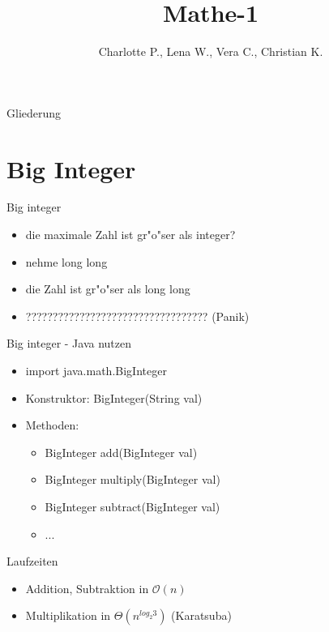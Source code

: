 \documentclass[18pt]{beamer}
\title[Short title]{Mathe-1}
\author{Charlotte P., Lena W., Vera C., Christian K.}
\institute{ITI Wagner \& IPD Tichy}
\begin{document}

\begin{frame}
\titlepage
\end{frame}

\begin{frame}{Gliederung}
\tableofcontents
\end{frame}

\section {Big Integer}
\begin{frame}{Big integer}
\begin {itemize}
\item die maximale Zahl ist gr"o"ser als integer?
\pause 
\item nehme long long
\pause
\item die Zahl ist gr"o"ser als long long
\pause 
\item ?????????????????????????????????? (Panik) 
\end {itemize}
\end{frame}

\begin{frame}{Big integer - Java nutzen}
\begin {itemize}
\item import java.math.BigInteger
\item Konstruktor: BigInteger(String val)
\item Methoden:
\begin {itemize}
\item BigInteger add(BigInteger val)
\item BigInteger multiply(BigInteger val)
\item BigInteger subtract(BigInteger val)
\item ...
\end {itemize}
\end {itemize}
\end{frame}

\begin{frame} {Laufzeiten}
\begin {itemize}
\item Addition, Subtraktion in $\mathcal{O}(n)$
\item Multiplikation in $\Theta(n^{log_{2}3})$ (Karatsuba)
\end {itemize}
\end{frame}
\end{document}
